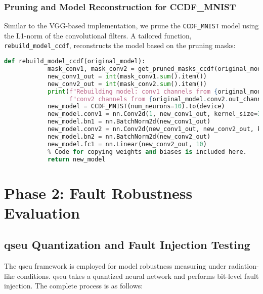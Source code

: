        \subsubsection{Pruning and Model Reconstruction for CCDF\_MNIST}
        Similar to the VGG-based implementation, we prune the \texttt{CCDF\_MNIST} model using the L1-norm of the convolutional filters. A tailored function, \texttt{rebuild\_model\_ccdf}, reconstructs the model based on the pruning masks:
        \begin{lstlisting}[caption={Model Reconstruction for CCDF\_MNIST}, language=Python]
        def rebuild_model_ccdf(original_model):
            mask_conv1, mask_conv2 = get_pruned_masks_ccdf(original_model)
            new_conv1_out = int(mask_conv1.sum().item())
            new_conv2_out = int(mask_conv2.sum().item())
            print(f"Rebuilding model: conv1 channels from {original_model.conv1.out_channels} to {new_conv1_out}, "
                  f"conv2 channels from {original_model.conv2.out_channels} to {new_conv2_out}")
            new_model = CCDF_MNIST(num_neurons=10).to(device)
            new_model.conv1 = nn.Conv2d(1, new_conv1_out, kernel_size=3, stride=1, bias=True)
            new_model.bn1 = nn.BatchNorm2d(new_conv1_out)
            new_model.conv2 = nn.Conv2d(new_conv1_out, new_conv2_out, kernel_size=3, stride=1, bias=True)
            new_model.bn2 = nn.BatchNorm2d(new_conv2_out)
            new_model.fc1 = nn.Linear(new_conv2_out, 10)
            % Code for copying weights and biases is included here.
            return new_model
        \end{lstlisting}
    
    
    
    


\section{Phase 2: Fault Robustness Evaluation}
    \subsection{\gls{qseu} Quantization and Fault Injection Testing}
    
        The \gls{qseu} framework is employed for model robustness measuring under radiation-like conditions. \gls{qseu} takes a quantized neural network and performs bit-level fault injection. The complete process is as follows:
        
